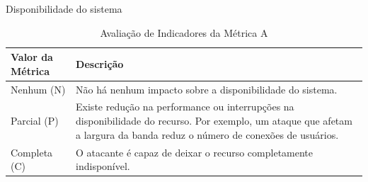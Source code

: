 \begin{itemize}
Disponibilidade do sistema
		\begin{table}[H]
	\begin{center}
	    \begin{tabular}{ | l | p{10cm} |}
	    \hline
	    Valor da Métrica & Descrição \\ \hline
	    Nenhum (N) & Não há nenhum impacto sobre a disponibilidade do sistema. \\ \hline
	    Parcial (P) & Existe redução na performance ou interrupções na disponibilidade do recurso. Por exemplo, um ataque que afetam a largura da banda reduz o número de conexões de usuários.\\ \hline
	    Completa (C) & O atacante é capaz de deixar o recurso completamente indisponível.\\ \hline
	    \end{tabular}
	    \caption{Avaliação de Indicadores da Métrica A}
	    \label{tab:a_scoring}
	\end{center}
	\end{table}
\end{itemize}